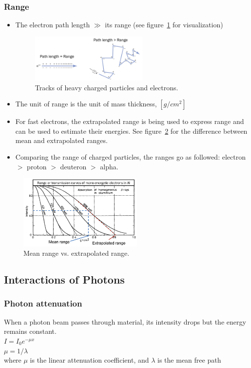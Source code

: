 \subsubsection{Range}
\begin{itemize}
    \item The electron path length $\gg$ its range (see figure~\ref{fig:range_vs_pathlength} for visualization)
    \begin{figure}[ht]
        \centering
        \includegraphics[width=0.55\textwidth]{images/range_vs_pathlength.png}
        \caption{Tracks of heavy charged particles and electrons.}
        \label{fig:range_vs_pathlength}
    \end{figure}
    \item The unit of range is the unit of mass thickness, $[g/cm^2]$
    \item For fast electrons, the extrapolated range is being used to express range and can be used to estimate their energies. See figure~\ref{fig:electron_range} for the difference between mean and extrapolated ranges.
    \item Comparing the range of charged particles, the ranges go as followed: electron $>$ proton $>$ deuteron $>$ alpha.
\end{itemize}
\begin{figure}[ht]
    \centering
    \includegraphics[width=0.55\textwidth]{images/electron_range.png}
    \caption{Mean range vs. extrapolated range.}
    \label{fig:electron_range}
\end{figure}
\subsection{Interactions of Photons}
\subsubsection{Photon attenuation}
When a photon beam passes through material, its intensity drops but the energy remains constant.\\
$I=I_0e^{-\mu x}$\\
$\mu=1/\lambda$\\
where $\mu$ is the linear attenuation coefficient, and $\lambda$ is the mean free path
